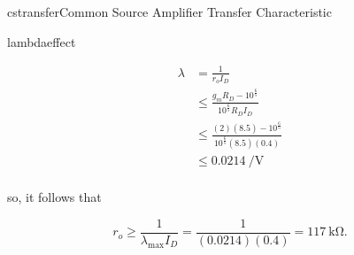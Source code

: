 \begin{mainquestion}{cstransfer}{Common Source Amplifier Transfer Characteristic}
\begin{partquestion}{lambdaeffect}
\begin{answer}
\begin{align*}
    \lambda &= \frac{1}{r_o I_D} \\
    &\leq \frac{g_m R_D - 10^\frac{6}{5}}{10^\frac{6}{5}R_D I_D} \\
    &\leq \frac{(2) (8.5) - 10^\frac{6}{5}}{10^\frac{6}{5}(8.5)(0.4)} \\
    &\leq \qty{0.0214}{\per\volt} \\
\end{align*}

so, it follows that

\[
r_{o} \geq \frac{1}{\lambda_{\max} I_{D}} = \frac{1}{(0.0214)(0.4)} = \qty{117}{\kilo\ohm}.
\]
\end{answer}
\end{partquestion}

\end{mainquestion}
